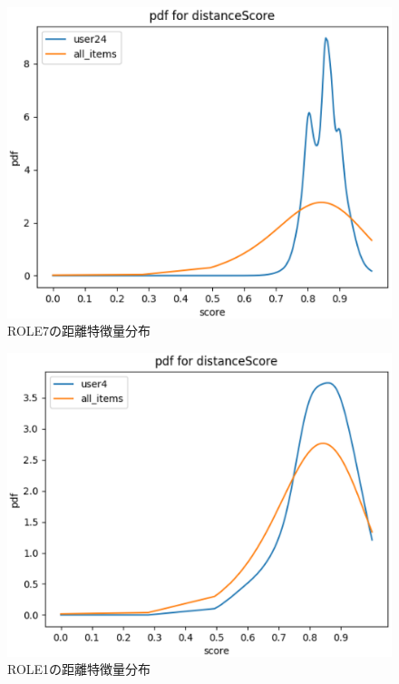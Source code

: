 \begin{figure}[H]
  \begin{center}
    \includegraphics[width=6in]{source/ROLE7-distance.eps}
  \vspace{1mm}
  \caption{ROLE7の距離特徴量分布} %
  \label{fig:ROLE7-distance}
  \end{center} 
\end{figure}

\begin{figure}[H]
  \begin{center}
    \includegraphics[width=6in]{source/ROLE1-distance.eps}
  \vspace{1mm}
  \caption{ROLE1の距離特徴量分布} %
  \label{fig:ROLE1-distance}
  \end{center} 
\end{figure}

